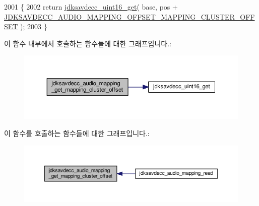 \begin{DoxyCode}
2001 \{
2002     \textcolor{keywordflow}{return} \hyperlink{group__endian_ga3fbbbc20be954aa61e039872965b0dc9}{jdksavdecc\_uint16\_get}( base, pos + 
      \hyperlink{group__audio__mapping_ga174ac05daccbcd25f401eac241ad6667}{JDKSAVDECC\_AUDIO\_MAPPING\_OFFSET\_MAPPING\_CLUSTER\_OFFSET}
       );
2003 \}
\end{DoxyCode}


이 함수 내부에서 호출하는 함수들에 대한 그래프입니다.\+:
\nopagebreak
\begin{figure}[H]
\begin{center}
\leavevmode
\includegraphics[width=350pt]{group__audio__mapping_gac2d9b5fab8b77bfaf402f489af76a243_cgraph}
\end{center}
\end{figure}




이 함수를 호출하는 함수들에 대한 그래프입니다.\+:
\nopagebreak
\begin{figure}[H]
\begin{center}
\leavevmode
\includegraphics[width=350pt]{group__audio__mapping_gac2d9b5fab8b77bfaf402f489af76a243_icgraph}
\end{center}
\end{figure}


